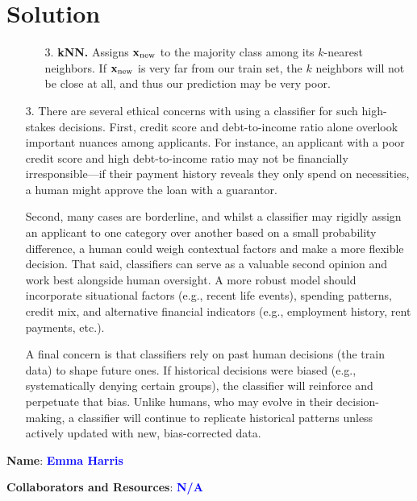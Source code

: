 \documentclass[submit]{../harvardml}
\newenvironment{solution}
  {\color{blue}\section*{Solution}}
{}
\begin{document}
\begin{solution}
\begin{enumerate}
\begin{enumerate}
        \item[3.] \textbf{kNN.} Assigns $\mathbf{x}_\text{new}$ to the majority class among its $k$-nearest neighbors. If $\mathbf{x}_\text{new}$ is very far from our train set, the $k$ neighbors will not be close at all, and thus our prediction may be very poor.
    \end{enumerate}

    \item[3.] There are several ethical concerns with using a classifier for such high-stakes decisions. First, credit score and debt-to-income ratio alone overlook important nuances among applicants. For instance, an applicant with a poor credit score and high debt-to-income ratio may not be financially irresponsible—if their payment history reveals they only spend on necessities, a human might approve the loan with a guarantor.

\vspace{.5em}
Second, many cases are borderline, and whilst a classifier may rigidly assign an applicant to one category over another based on a small probability difference, a human could weigh contextual factors and make a more flexible decision. That said, classifiers can serve as a valuable second opinion and work best alongside human oversight. A more robust model should incorporate situational factors (e.g., recent life events), spending patterns, credit mix, and alternative financial indicators (e.g., employment history, rent payments, etc.).

\vspace{.5em}
A final concern is that classifiers rely on past human decisions (the train data) to shape future ones. If historical decisions were biased (e.g., systematically denying certain groups), the classifier will reinforce and perpetuate that bias. Unlike humans, who may evolve in their decision-making, a classifier will continue to replicate historical patterns unless actively updated with new, bias-corrected data.
\end{enumerate}

\end{solution}

\clearpage

\textbf{Name}: \textbf{\textcolor{blue}{Emma Harris}}

\vspace{.5em}
\textbf{Collaborators and Resources}: \textbf{\textcolor{blue}{N/A}}
\end{document}
